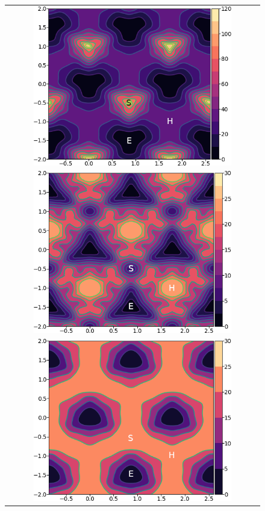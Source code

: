 \documentclass[a4paper,11pt]{article}
\begin{document}
        \begin{figure}
    \begin{tabular}{c}
	     \includegraphics[width=0.8\textwidth]{Images/itakura_dislocation_energy_landscape_2_labelled.png} \\
             \includegraphics[width=0.8\textwidth]{Images/tbe_dislocation_energy_landscape_pure_labelled.png}  \\
             \includegraphics[width=0.8\textwidth]{Images/tbe_dislocation_energy_landscape_canonical_actual_labelled.png}  \\

\end{tabular}
\end{figure}
\end{document}

